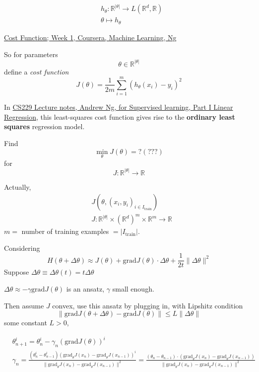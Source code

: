 \documentclass[10pt]{amsart}
\begin{document}
\begin{multicols*}{2}
\[
\begin{aligned}
  & h_{\theta} : \mathbb{R}^{ | \theta | } \to L(\mathbb{R}^d , \mathbb{R})  \\ 
  &  \theta \mapsto h_{\theta}
  \end{aligned}
\]

\href{https://www.coursera.org/learn/machine-learning/lecture/rkTp3/cost-function}{Cost Function; Week 1, Coursera, Machine Learning, Ng}

So for parameters
\[
\theta \in \mathbb{R}^{ |\theta| }
\]
define a \emph{cost function}
\begin{equation}
  J(\theta) = \frac{1}{2 m} \sum_{i=1}^m (h_{\theta}(x_i) - y_i)^2 
\end{equation}

In \href{http://cs229.stanford.edu/notes/cs229-notes1.pdf}{CS229 Lecture notes, Andrew Ng, for Supervised learning, Part I Linear Regression}, this least-squares cost function gives rise to the \textbf{ordinary least squares} regression model.  

Find
\[
\min_{\theta} J(\theta) = ? (???)
\]
for
\[
J : \mathbb{R}^{ |\theta| } \to \mathbb{R}
\]

Actually,
\begin{equation}
  \begin{aligned}
    & J(\theta, (x_i, y_i)_{i \in I_{\text{train}}} ) \\ 
    & J: \mathbb{R}^{ |\theta|} \times (\mathbb{R}^d)^m \times \mathbb{R}^m \to \mathbb{R}
    \end{aligned}
 \end{equation}
$m=$ number of training examples $= |I_{\text{train}}|$.  

Considering
\[
H(\theta + \Delta \theta ) \approx J(\theta) + \text{grad}J(\theta) \cdot \Delta \theta + \frac{1}{2t} \| \Delta \theta \|^2
\]
Suppose $\Delta \theta \equiv \Delta \theta(t) = t\Delta \theta$

$\Delta \theta \approx - \gamma \text{grad}J(\theta)$ is an ansatz, $\gamma$ small enough.

Then assume $J$ convex, use this ansatz by plugging in, with Lipshitz condition
\[
\| \text{grad}J(\theta + \Delta \theta) - \text{grad}J(\theta) \| \leq L \| \Delta \theta \| 
\]
some constant $L > 0$,

\begin{equation}
\begin{aligned}
  & \theta_{n+1}^i = \theta^i_n - \gamma_n (\text{grad}J(\theta))^i \\ 
 & \gamma_n = \frac{ (\theta^i_n - \theta^i_{n-1} ) (\text{grad}_{\theta}J(x_n) - \text{grad}_{\theta}J(x_{n-1}))^i }{ \| \text{grad}_{\theta} J(x_n) - \text{grad}_{\theta}J(x_{n-1})\|^2 } = \frac{ (\theta_n - \theta_{n-1} )\cdot  (\text{grad}_{\theta}J(x_n) - \text{grad}_{\theta}J(x_{n-1})) }{ \| \text{grad}_{\theta} J(x_n) - \text{grad}_{\theta}J(x_{n-1})\|^2 }
  \end{aligned}
  \end{equation}


\end{multicols*}
\end{document}
